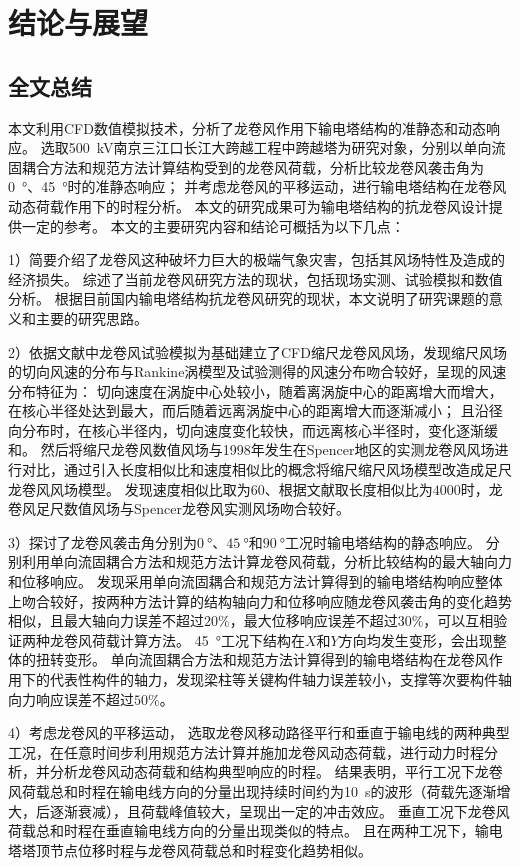 
\chapter{结论与展望}

\section{全文总结}

本文利用CFD数值模拟技术，分析了龙卷风作用下输电塔结构的准静态和动态响应。
选取\SI{500}{kV}南京三江口长江大跨越工程中跨越塔为研究对象，分别以单向流固耦合方法和规范方法计算结构受到的龙卷风荷载，分析比较龙卷风袭击角为\SI{0}{\degree}、\SI{45}{\degree}时的准静态响应；
并考虑龙卷风的平移运动，进行输电塔结构在龙卷风动态荷载作用下的时程分析。
本文的研究成果可为输电塔结构的抗龙卷风设计提供一定的参考。
本文的主要研究内容和结论可概括为以下几点：

1）简要介绍了龙卷风这种破坏力巨大的极端气象灾害，包括其风场特性及造成的经济损失。
综述了当前龙卷风研究方法的现状，包括现场实测、试验模拟和数值分析。
根据目前国内输电塔结构抗龙卷风研究的现状，本文说明了研究课题的意义和主要的研究思路。

2）依据文献中龙卷风试验模拟为基础建立了CFD缩尺龙卷风风场，发现缩尺风场的切向风速的分布与Rankine涡模型及试验测得的风速分布吻合较好，呈现的风速分布特征为：
切向速度在涡旋中心处较小，随着离涡旋中心的距离增大而增大，在核心半径处达到最大，而后随着远离涡旋中心的距离增大而逐渐减小；
且沿径向分布时，在核心半径内，切向速度变化较快，而远离核心半径时，变化逐渐缓和。
然后将缩尺龙卷风数值风场与1998年发生在Spencer地区的实测龙卷风风场进行对比，通过引入长度相似比和速度相似比的概念将缩尺缩尺风场模型改造成足尺龙卷风风场模型。
发现速度相似比取为$60$、根据文献取长度相似比为$4000$时，龙卷风足尺数值风场与Spencer龙卷风实测风场吻合较好。

3）探讨了龙卷风袭击角分别为$\SI{0}{\degree}$、$\SI{45}{\degree}$和$\SI{90}{\degree}$工况时输电塔结构的静态响应。
分别利用单向流固耦合方法和规范方法计算龙卷风荷载，分析比较结构的最大轴向力和位移响应。
发现采用单向流固耦合和规范方法计算得到的输电塔结构响应整体上吻合较好，按两种方法计算的结构轴向力和位移响应随龙卷风袭击角的变化趋势相似，且最大轴向力误差不超过$20\%$，最大位移响应误差不超过$30\%$，可以互相验证两种龙卷风荷载计算方法。
\SI{45}{\degree}工况下结构在$X$和$Y$方向均发生变形，会出现整体的扭转变形。
单向流固耦合方法和规范方法计算得到的输电塔结构在龙卷风作用下的代表性构件的轴力，发现梁柱等关键构件轴力误差较小，支撑等次要构件轴向力响应误差不超过$50\%$。

4）考虑龙卷风的平移运动，  选取龙卷风移动路径平行和垂直于输电线的两种典型工况，在任意时间步利用规范方法计算并施加龙卷风动态荷载，进行动力时程分析，并分析龙卷风动态荷载和结构典型响应的时程。
结果表明，平行工况下龙卷风荷载总和时程在输电线方向的分量出现持续时间约为\SI{10}{s}的波形（荷载先逐渐增大，后逐渐衰减），且荷载峰值较大，呈现出一定的冲击效应。
垂直工况下龙卷风荷载总和时程在垂直输电线方向的分量出现类似的特点。
且在两种工况下，输电塔塔顶节点位移时程与龙卷风荷载总和时程变化趋势相似。


